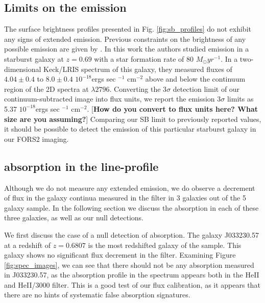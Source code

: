\documentclass[twocolumn]{aastex6}
\begin{document}
\subsection{Limits on the  emission}
The surface brightness profiles presented in Fig. \ref{fig:sb_profiles} do not exhibit any signs of extended  emission. Previous constraints on the brightness of any possible emission are given by  \cite{Rubin_2011}. In this work the authors studied emission in a starburst galaxy at $z=0.69$ with a star formation rate of 80 $M_{\odot} yr^{-1}$. In a two-dimensional Keck/LRIS spectrum of this galaxy, they measured fluxes of $4.04 \pm 0.4$ to $8.0\pm 0.4$ $10^{-18}$ergs sec $^{-1}$ cm$^{-2}$  above and below the continuum region of the 2D spectra at $\lambda 2796$. Converting the 3$\sigma$ detection limit of our continuum-subtracted  image into flux units, we report the  emission 3$\sigma$ limits as 5.37 $10^{-18}$ergs sec $^{-1}$ cm$^{-2}$. 
[{\bf How do you convert to flux units here?  What size are you assuming?}]
Comparing our SB limit to previously reported values, it should be possible to detect the emission of this particular starburst galaxy in our FORS2 imaging.

\subsection{ absorption in the line-profile}
Although we do not measure any extended  emission, we do observe a decrement of flux in the galaxy continua measured in the  filter in 3 galaxies out of the 5 galaxy sample. In the following section we discuss the absorption in each of these three galaxies, as well as our null detections.

We first discuss the case of a null detection of  absorption. The galaxy J033230.57 at a redshift of $z=0.6807$ is the most redshifted galaxy of the sample. This galaxy shows no significant flux decrement in the  filter. Examining Figure \ref{fig:spec_images}, we can see that there should not be any absorption measured in J033230.57, as the absorption profile in the spectrum appears both in the HeII and HeII/3000 filter. This is a good test of our flux calibration, as it appears that there are no hints of systematic false absorption signatures.
\end{document}
